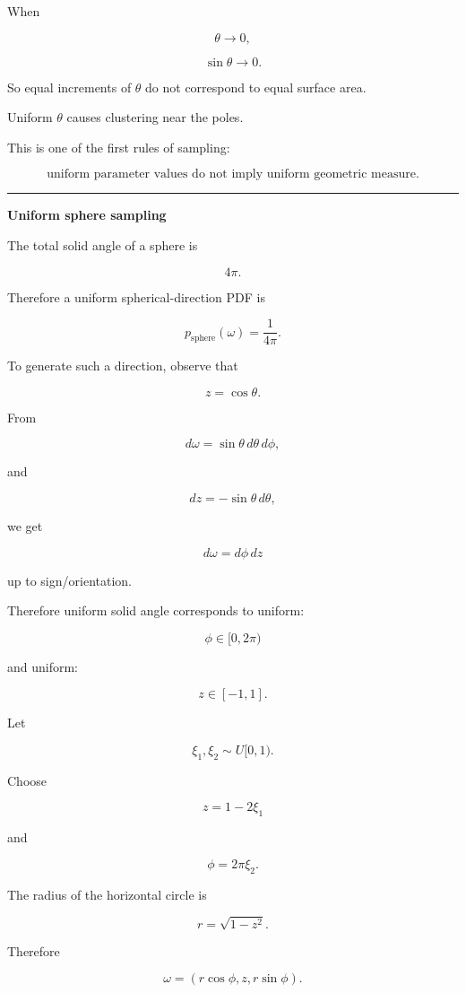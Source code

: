 When

\[
\theta\rightarrow0,
\]

\[
\sin\theta\rightarrow0.
\]

So equal increments of \(\theta\) do not correspond to equal surface area.

Uniform \(\theta\) causes clustering near the poles.

This is one of the first rules of sampling:

\[
\boxed{
\text{uniform parameter values do not imply uniform geometric measure.}
}
\]

\begin{center}\rule{0.5\linewidth}{0.5pt}\end{center}

\textbf{Uniform sphere sampling}

The total solid angle of a sphere is

\[
4\pi.
\]

Therefore a uniform spherical-direction PDF is

\[
\boxed{
p_{\text{sphere}}(\omega)
=
\frac{1}{4\pi}.
}
\]

To generate such a direction, observe that

\[
z=\cos\theta.
\]

From

\[
d\omega
=
\sin\theta\,d\theta\,d\phi,
\]

and

\[
dz=-\sin\theta\,d\theta,
\]

we get

\[
d\omega=d\phi\,dz
\]

up to sign/orientation.

Therefore uniform solid angle corresponds to uniform:

\[
\phi\in[0,2\pi)
\]

and uniform:

\[
z\in[-1,1].
\]

Let

\[
\xi_1,\xi_2\sim U[0,1).
\]

Choose

\[
\boxed{
z=1-2\xi_1
}
\]

and

\[
\boxed{
\phi=2\pi\xi_2.
}
\]

The radius of the horizontal circle is

\[
r=\sqrt{1-z^2}.
\]

Therefore

\[
\boxed{
\omega=
\left(
r\cos\phi,
z,
r\sin\phi
\right).
}
\]


